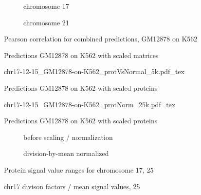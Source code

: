 \begin{appendices}
\begin{figure}[hb]
 \centering
 \begin{subfigure}{0.495\textwidth}
 \centering
 \caption{chromosome 17}
 \label{fig:app:Pearson:GM12878:K562:chr17:25kb:combi}
\end{subfigure} \hfill
\begin{subfigure}{0.495\textwidth}
 \centering
 \caption{chromosome 21}
 \label{fig:app:Pearson:GM12878:K562:chr21:25kb:combi}
 \end{subfigure}
 \caption{Pearson correlation for combined predictions, GM12878 on K562}
\end{figure}

\begin{figure}[hb]
 \centering
 \caption{Predictions GM12878 on K562 with scaled matrices}
 \label{fig:app:GM12878:K562:chr17:normalizedMatrices}
\end{figure}
\begin{figure}[hb]
 \centering
 \scriptsize
 {chr17-12-15_GM12878-on-K562_protVsNormal_5k.pdf_tex}
 \caption{Predictions GM12878 on K562 with scaled proteins}
 \label{fig:app:GM12878:K562:chr17:normalizedProteins}
\end{figure}

\begin{figure}[hb]
 \centering
 \scriptsize
 {chr17-12-15_GM12878-on-K562_protNorm_25k.pdf_tex}
 \caption{Predictions GM12878 on K562 with scaled proteins}
 \label{fig:app:GM12878:K562:chr17:normalizedProteins:25k}
\end{figure}

\begin{figure}[hb]
 \centering
 \begin{subfigure}{0.495\textwidth}
 \centering
 \caption{before scaling / normalization}
 \label{fig:app:prots:valueRangeBefore}
\end{subfigure} \hfill
\begin{subfigure}{0.495\textwidth}
 \centering
 \caption{division-by-mean normalized }
 \label{fig:app:prots:valueRangeDivByMean}
 \end{subfigure}
 \caption{Protein signal value ranges for chromosome 17, \SI{25}{\kilo\bp}}
\end{figure}
\begin{figure}
 \centering
 \caption{chr17 divison factors / mean signal values, \SI{25}{\kilo\bp}}
 \label{fig:app:prots:divByMeanFactors}
 \end{figure}


\end{appendices}
